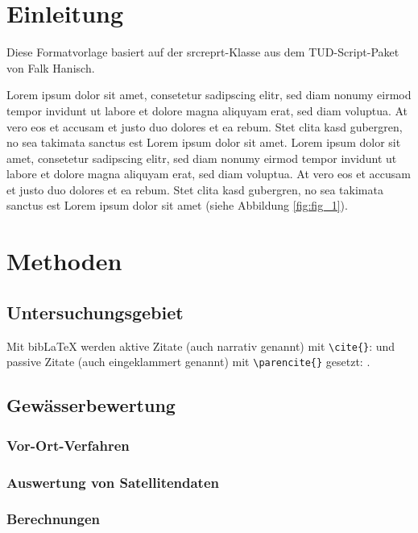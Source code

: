 \documentclass[english,ngerman,BCOR=6mm,cdgeometry=no,parskip=half,DIV=13]{tudscrreprt}
\begin{document}
\chapter{Einleitung}

Diese Formatvorlage basiert auf der srcreprt-Klasse aus dem TUD-Script-Paket von
Falk Hanisch.

Lorem ipsum dolor sit amet, consetetur sadipscing elitr, sed diam nonumy eirmod
tempor invidunt ut labore et dolore magna aliquyam erat, sed diam voluptua. At
vero eos et accusam et justo duo dolores et ea rebum. Stet clita kasd gubergren,
no sea takimata sanctus est Lorem ipsum dolor sit amet. Lorem ipsum dolor sit
amet, consetetur sadipscing elitr, sed diam nonumy eirmod tempor invidunt ut
labore et dolore magna aliquyam erat, sed diam voluptua. At vero eos et accusam
et justo duo dolores et ea rebum. Stet clita kasd gubergren, no sea takimata
sanctus est Lorem ipsum dolor sit amet (siehe Abbildung \ref{fig:fig_1}).

\chapter{Methoden}

\section{Untersuchungsgebiet}

Mit bibLaTeX werden aktive Zitate (auch narrativ genannt) mit \texttt{\textbackslash cite\{\}}: \cite{r-core-2024} und passive Zitate (auch eingeklammert genannt) mit \texttt{\textbackslash parencite\{\}} gesetzt: \parencite{r-core-2024}.

\section{Gewässerbewertung}

\subsection{Vor-Ort-Verfahren}

\subsection{Auswertung von Satellitendaten}

\subsection{Berechnungen}
\end{document}
